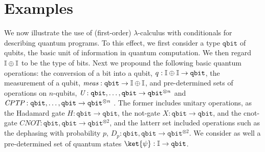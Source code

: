 








\section{Examples}

We now illustrate the use of (first-order) $\lambda$-calculus with conditionals for describing quantum
programs. To this effect, we first consider a type $\mathtt{qbit}$ of qubits, the
basic unit of information in quantum computation. We then regard $\mathbb{I} \oplus
\mathbb{I}$ to be the type of bits. Next we propound the following
basic quantum operations:  the conversion of a bit into a qubit, $q : \mathbb{I}
\oplus \mathbb{I}  \to \mathtt{qbit}$, the measurement of a qubit,
$\emph{meas}:\mathtt{qbit} \to \mathbb{I} \oplus \mathbb{I}$, and pre-determined sets of
operations on $n$-qubits, $\emph{U}:\mathtt{qbit},\ldots,\mathtt{qbit} \to
\mathtt{qbit}^{\otimes n}$ and $\emph{CPTP}:\mathtt{qbit},\ldots,\mathtt{qbit} \to
\mathtt{qbit}^{\otimes n}$ . The former includes unitary operations, as the Hadamard
gate $H : \mathtt{qbit} \to \mathtt{qbit}$, the not-gate $X : \mathtt{qbit} \to
\mathtt{qbit}$, and the cnot-gate $CNOT : \mathtt{qbit},\mathtt{qbit} \to
\mathtt{qbit}^{\otimes 2}$, and the  latterr set included operations such as the dephasing with probability $p$, $D_p : \mathtt{qbit},\mathtt{qbit} \to
\mathtt{qbit}^{\otimes 2}$. We consider as well a pre-determined set of quantum
states $\ket{\psi} : \typeI \to \mathtt{qbit}$.  

